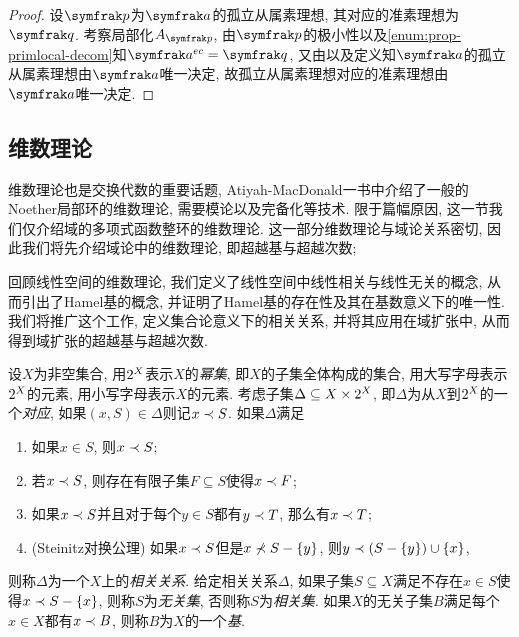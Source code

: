 \begin{proof}
  设$\ideal{p}$为$\ideal{a}$的孤立从属素理想, 其对应的准素理想为$\ideal{q}$. 考察局部化$A_{\ideal{p}}$, 由$\ideal{p}$的极小性以及\ref{enum:prop-primlocal-decom}知$\ideal{a}^{ec}=\ideal{q}$, 又由以及定义知$\ideal{a}$的孤立从属素理想由$\ideal{a}$唯一决定, 故孤立从属素理想对应的准素理想由$\ideal{a}$唯一决定.
\end{proof}

\subsection{维数理论}\label{subsec:algebra-dimension}

维数理论也是交换代数的重要话题, Atiyah-MacDonald\parencite[116--126, Chapter 11]{atiyah_introduction_1969}一书中介绍了一般的Noether局部环的维数理论, 需要模论以及完备化等技术. 限于篇幅原因, 这一节我们仅介绍域的多项式函数整环的维数理论. 这一部分维数理论与域论关系密切, 因此我们将先介绍域论中的维数理论, 即超越基与超越次数;%


回顾线性空间的维数理论, 我们定义了线性空间中线性相关与线性无关的概念, 从而引出了Hamel基的概念, 并证明了\parencite[44--46, Section 2.1]{ciarlet_linear_2013}Hamel基的存在性\footnotemark 及其在基数意义下的唯一性. 我们将推广这个工作, 定义集合论意义下的相关关系, 并将其应用在域扩张中, 从而得到域扩张的超越基与超越次数.

设$X$为非空集合, 用$2^{X}$表示$X$的\emph{幂集}, 即$X$的子集全体构成的集合, 用大写字母表示$2^{X}$的元素, 用小写字母表示$X$的元素. 考虑子集$\Delta\subseteq X\times 2^{X}$, 即$\Delta$为从$X$到$2^{X}$的一个\emph{对应}, 如果$(x, S)\in \Delta$则记$x\prec S$. 如果$\Delta$满足
\begin{enumerate}
  \item\label{enum:dependaxiom1} 如果$x\in S$, 则$x\prec S$;
  \item\label{enum:dependaxiom2} 若$x\prec S$, 则存在有限子集$F\subseteq S$使得$x\prec F$;
  \item\label{enum:dependaxiom3} 如果$x\prec S$并且对于每个$y\in S$都有$y\prec T$, 那么有$x\prec T$;
  \item\label{enum:dependaxiom4} (Steinitz对换公理) 如果$x\prec S$但是$x\nprec S-\{y\}$, 则$y\prec (S-\{y\})\cup\{x\}$,
\end{enumerate}
则称$\Delta$为一个$X$上的\emph{相关关系}. 给定相关关系$\Delta$, 如果子集$S\subseteq X$满足不存在$x\in S$使得$x\prec S-\{x\}$, 则称$S$为\emph{无关集}, 否则称$S$为\emph{相关集}. 如果$X$的无关子集$B$满足每个$x\in X$都有$x\prec B$, 则称$B$为$X$的一个\emph{基}.

